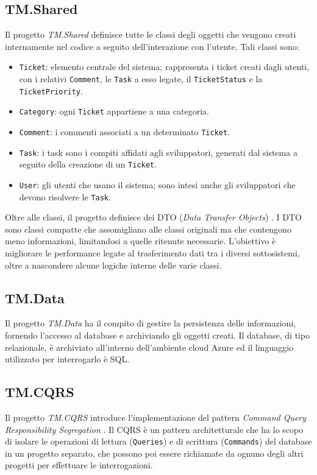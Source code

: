 \subsection{TM.Shared}
Il progetto \textit{TM.Shared} definisce tutte le classi degli oggetti che vengono creati internamente nel codice a seguito dell'interazione
con l'utente. Tali classi sono:
\begin{itemize}
    \item \texttt{Ticket}: elemento centrale del sistema; rappresenta i ticket creati dagli utenti, con i relativi \texttt{Comment},
        le \texttt{Task} a esso legate, il \texttt{TicketStatus} e la \texttt{TicketPriority}.
    \item \texttt{Category}: ogni \texttt{Ticket} appartiene a una categoria.
    \item \texttt{Comment}: i commenti associati a un determinato \texttt{Ticket}.
    \item \texttt{Task}: i task sono i compiti affidati agli sviluppatori, generati dal sistema a seguito della creazione
        di un \texttt{Ticket}.
    \item \texttt{User}: gli utenti che usano il sistema; sono intesi anche gli sviluppatori che devono risolvere le \texttt{Task}.
\end{itemize}
Oltre alle classi, il progetto definisce dei DTO (\textit{Data Transfer Objects}) \cite{microsoft_webapi_ef_part5}.
I DTO sono classi compatte che assomigliano alle classi originali ma che contengono meno informazioni, limitandosi a quelle ritenute necessarie.
L'obiettivo è migliorare le performance legate al trasferimento dati tra i diversi sottosistemi, oltre a nascondere alcune logiche interne delle varie classi.

\subsection{TM.Data}
Il progetto \textit{TM.Data} ha il compito di gestire la persistenza delle informazioni, fornendo l'accesso al database
e archiviando gli oggetti creati. Il database, di tipo relazionale, è archiviato all'interno dell'ambiente cloud Azure ed il linguaggio utilizzato
per interrogarlo è SQL.

\subsection{TM.CQRS}
Il progetto \textit{TM.CQRS} introduce l'implementazione del pattern \textit{Command Query Responsibility Segregation} \cite{azure_cqrs_msdocs}.
Il CQRS è un pattern architetturale che ha lo scopo di isolare le operazioni di lettura (\texttt{Queries}) e di scrittura (\texttt{Commands})
del database in un progetto separato, che possono poi essere richiamate da ognuno degli altri progetti per effettuare le interrogazioni.

